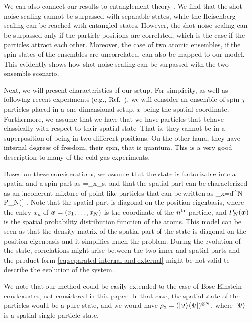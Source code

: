 We can also connect our results to entanglement theory \cite{Werner1989,Horodecki2009,Guehne2009}.
We find that the shot-noise scaling cannot be surpassed with separable states, while the Heisenberg scaling can be reached with entangled states.
However, the shot-noise scaling can be surpassed only if the particle positions are correlated, which is the case if the particles attract each other.
Moreover, the case of two atomic ensembles, if the spin states of the ensembles are uncorrelated, can also be mapped to our model.
This evidently shows how shot-noise scaling can be surpassed with the two-ensemble scenario.

Next, we will present characteristics of our setup.
For simplicity, as well as following  recent experiments (e.g., Ref.~\cite{Koschorreck2011}), we will consider an ensemble of spin-$j$ particles placed in a one-dimensional setup, $x$ being the spatial coordinate.
Furthermore, we assume that we have that we have particles that behave classically with respect to their spatial state.
That is, they cannot be in a superposition of being in two different positions.
On the other hand, they have internal degrees of freedom, their spin, that is quantum. This is a very good description to many of the cold gas experiments.

Based on these considerations, we assume that the state is factorizable into a spatial and a spin part as
\be
\label{eq:separated-internal-and-external}
\rho=\rho_{{\rm x}}\otimes\rho_{{\rm s}},
\ee
and that the spatial part can be characterized as an incoherent mixture of point-like particles that can be written as
\be
  \label{eq:thermal-state}
  \rho_{\rm x}=\int d^N\, P_N() .
\ee
Note that the spatial part is diagonal on the position eigenbasis, where the entry $x_n$ of $\boldsymbol{x} =(x_1,\dots,x_N)$ is the coordinate of the $n^{\rm th}$ particle, and $P_N(\boldsymbol{x})$ is the spatial probability distribution function of the atoms.
This model can be seen as that the density matrix of the spatial part of the state is diagonal on the position eigenbasis and it simplifies much the problem.
During the evolution of the state, correlations might arise between the two inner and spatial parts and the product form \eqref{eq:separated-internal-and-external} might be not valid to describe the evolution of the system.

We note that our method could be easily extended to the case of Bose-Einstein condensates, not considered in this paper. In that case, the spatial state of the particles would be a pure state, and we would have $\rho_{\rm x}=(\vert\Psi\rangle\langle\Psi\vert )^{\otimes N},$ where $\vert \Psi \rangle$ is a spatial single-particle state.

